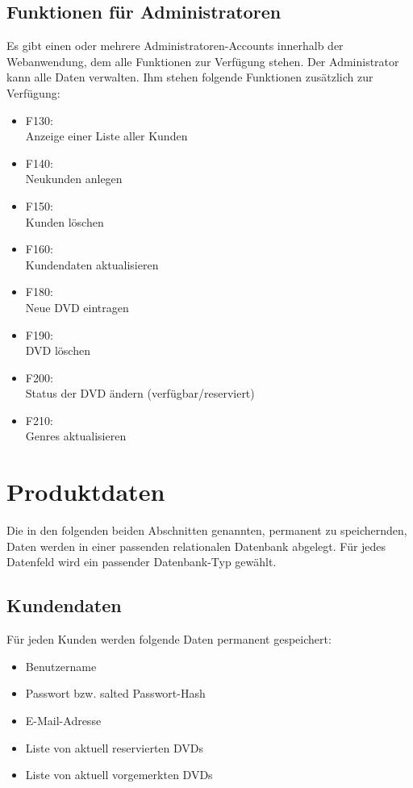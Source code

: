 \documentclass[12pt,oneside,a4paper,bibtotoc,liststotoc,pointlessnumbers]{scrartcl}
\begin{document}
\subsection{Funktionen für Administratoren}
Es gibt einen oder mehrere Administratoren-Accounts innerhalb der Webanwendung, dem alle Funktionen zur Verfügung stehen. Der Administrator kann alle Daten verwalten. Ihm stehen folgende Funktionen zusätzlich zur Verfügung:
\begin{itemize}
\item F130: \\Anzeige einer Liste aller Kunden
\item F140: \\Neukunden anlegen
\item F150: \\Kunden löschen
\item F160: \\Kundendaten aktualisieren
\item F180: \\Neue DVD eintragen \newpage
\item F190: \\DVD löschen
\item F200: \\Status der DVD ändern (verfügbar/reserviert)
\item F210: \\Genres aktualisieren
\end{itemize}
\newpage
\section{Produktdaten}
Die in den folgenden beiden Abschnitten genannten, permanent zu speichernden, Daten werden in einer passenden relationalen Datenbank abgelegt. Für jedes Datenfeld wird ein passender Datenbank-Typ gewählt.
\subsection{Kundendaten}
Für jeden Kunden werden folgende Daten permanent gespeichert:
\begin{itemize}
\item Benutzername
\item Passwort bzw. salted Passwort-Hash
\item E-Mail-Adresse
\item Liste von aktuell reservierten DVDs
\item Liste von aktuell vorgemerkten DVDs
\end{itemize}
\end{document}
